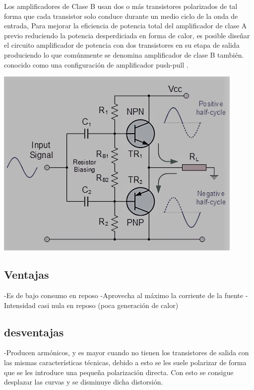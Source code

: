 \documentclass[12pt,a4paper]{article}
\begin{document}
Los amplificadores de Clase B usan dos o más transistores polarizados de tal forma que cada transistor solo conduce durante un medio ciclo de la onda de entrada, Para mejorar la eficiencia de potencia total del amplificador de clase A previo reduciendo la potencia desperdiciada en forma de calor, es posible diseñar el circuito amplificador de potencia con dos transistores en su etapa de salida produciendo lo que comúnmente se denomina amplificador de clase B también. conocido como una configuración de amplificador push-pull .
\begin{center}
\includegraphics[scale=.8]{imagenes/amplificadorB.JPG} 
\end{center}
\begin{flushleft}
\subsection{Ventajas}
-Es de bajo consumo en reposo
\linebreak
-Aprovecha al máximo la corriente de la fuente
\linebreak
-Intensidad casi nula en reposo (poca generación de calor)
\subsection{desventajas}
-Producen armónicos, y es mayor cuando no tienen los transistores de salida con las mismas características técnicas, debido a esto se les suele polarizar de forma que se les introduce una pequeña polarización directa. Con esto se consigue desplazar las curvas y se disminuye dicha distorsión.
\linebreak
\linebreak
\end{flushleft}
\end{document}

